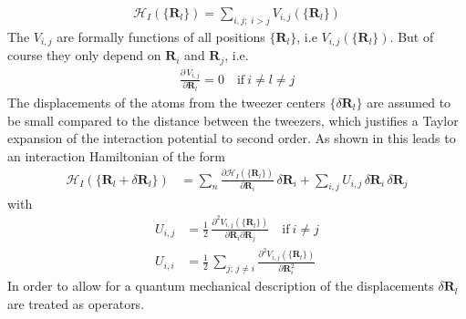 \begin{align*}
    \mathcal{H}_I(\{{\mathbf{R}}_l\}) = \sum_{i,j;\;i> j}V_{i,j}(\{{\mathbf{R}}_l\})
\end{align*}
The $V_{i,j}$ are formally functions of all positions $\{{\mathbf{R}}_l\}$, i.e $V_{i,j}(\{{\mathbf{R}}_l\})$. But of course they only depend on ${\mathbf{R}}_i$ and ${\mathbf{R}}_j$, i.e.
\begin{align*}
    \frac{\partial\,V_{i,j}}{\partial {\mathbf{R}}_l } = 0\quad\text{if}\:i\neq l\neq j
\end{align*}
The displacements of the atoms from the tweezer centers  $\{\delta\mathbf{R}_l\}$ are assumed to be small compared to the distance between the tweezers, which justifies a Taylor expansion of the interaction potential to second order. As shown in  this leads to an interaction Hamiltonian of the form
\begin{align*}
    \mathcal{H}_I(\{\mathbf{R}_l+\delta\mathbf{R}_l\})&=\sum_n\frac{\partial \mathcal{H}_I(\{\mathbf{R}_l\})}{\partial \mathbf{R}_i}\,\delta\mathbf{R}_i + \sum_{i,j}U_{i,j}\,\delta\mathbf{R}_i\,\delta\mathbf{R}_j
\end{align*}
with
\begin{equation}\label{eq:U-matrix}
\begin{aligned}
    U_{i,j}&=
        \frac12\,\frac{\partial^2 V_{i,j}(\{\mathbf{R}_l\})}{\partial \mathbf{R}_i\partial\mathbf{R}_j}\quad\text{if}\:i\neq j\\
    U_{i,i} &= \frac12\,\sum_{j;\,j\neq i}\frac{\partial^2 V_{i,j}(\{\mathbf{R}_l\})}{\partial \mathbf{R}_i^2}
\end{aligned}
\end{equation}
In order to allow for a quantum mechanical description of the displacements $\delta\mathbf{R}_l$ are treated as operators.\hfill\newpage

